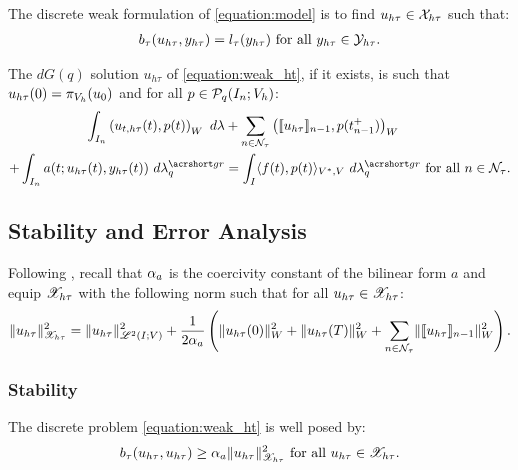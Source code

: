 \begin{definition}
    The discrete weak formulation of \ref{equation:model} is to find $u_{h \tau} \in \mathcal{X}_{h \tau}$ such that:
    \begin{gather} \label{equation:weak_ht}
        b_{\tau}(u_{h \tau}, y_{h \tau}) = l_{\tau}(y_{h \tau}) \text{ for all } y_{h \tau} \in \mathcal{Y}_{h \tau}.
    \end{gather}
\end{definition}

\begin{proposition}[Localization]
    The $dG(q)$ solution $u_{h \tau}$ of \eqref{equation:weak_ht}, if it exists, is such that $u_{h \tau}(0) = \pi_{V_h}(u_0)$ and for all $p \in \mathcal{P}_{q}(I_n; V_h)$:
    \begin{align}
        \int_{I_n} \left( u_{t, h \tau}(t), p(t) \right)_W ~ d \lambda & + \sum_{n \in \TimeIndices} \left( \llbracket u_{h \tau} \rrbracket_{n - 1}, p(t_{n - 1}^+) \right)_W \notag \\
        + \int_{I_n} a(t; u_{h \tau}(t), y_{h \tau}(t)) ~ d \lambdaGR_q & = \int_I \langle f(t), p(t) \rangle_{V^*, V} ~ d \lambdaGR_q \text{ for all } n \in \TimeIndices.
    \end{align}
\end{proposition}

\newpage
\subsection{Stability and Error Analysis}

Following \cite[p. 186]{Ern2021}, recall that $\alpha_{a}$ is the coercivity constant of the bilinear form $a$ and equip $\mathscr{X}_{h \tau}$ with the following norm such that for all $u_{h \tau} \in \mathscr{X}_{h \tau}$:
\begin{gather}
    \lVert u_{h \tau} \rVert_{\mathscr{X}_{h \tau}}^2 = \lVert u_{h \tau} \rVert_{\mathscr{L}^{2}(I; V)}^2 + \frac{1}{2 \alpha_{a}} \left( \lVert u_{h \tau}(0) \rVert_W^2 + \lVert u_{h \tau}(T) \rVert_W^2 + \sum_{n \in \mathcal{N}_{\tau}} \lVert \llbracket u_{h \tau} \rrbracket_{n - 1} \rVert_W^2 \right).
\end{gather}

\subsubsection{Stability}

\begin{lemma}[Coercivity]
    The discrete problem \eqref{equation:weak_ht} is well posed by:
    \begin{gather}
        b_{\tau}(u_{h \tau}, u_{h \tau}) \geq \alpha_{a} \lVert u_{h \tau} \rVert_{\mathscr{X}_{h \tau}}^2 \text{ for all } u_{h \tau} \in \mathscr{X}_{h \tau}.
    \end{gather}
\end{lemma}

